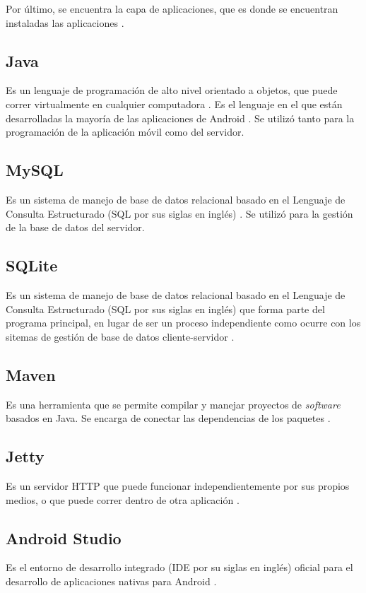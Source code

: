 Por último, se encuentra la capa de aplicaciones, que es donde se encuentran instaladas las aplicaciones \cite{AND3}.

\subsection{Java}
Es un lenguaje de programación de alto nivel orientado a objetos, que puede correr virtualmente en cualquier computadora \cite{JAV1}. Es el lenguaje en el que están desarrolladas la mayoría de las aplicaciones de Android \cite{AND2}. Se utilizó tanto para la programación de la aplicación móvil como del servidor.

\subsection{MySQL} 
Es un sistema de manejo de base de datos relacional basado en el Lenguaje de Consulta Estructurado (SQL por sus siglas en inglés) \cite{SQL1}. Se utilizó para la gestión de la base de datos del servidor.

\subsection{SQLite}
Es un sistema de manejo de base de datos relacional basado en el Lenguaje de Consulta Estructurado (SQL por sus siglas en inglés) que forma parte del programa principal, en lugar de ser un proceso independiente como ocurre con los sitemas de gestión de base de datos cliente-servidor \cite{SQL2}.

\subsection{Maven}
Es una herramienta que se permite compilar y  manejar proyectos de \textit{software} basados en Java. Se encarga de conectar las dependencias de los paquetes \cite{MVN1}.

\subsection{Jetty}
Es un servidor HTTP que puede funcionar independientemente por sus propios medios, o que puede correr dentro de otra aplicación \cite{JTY1}.

\subsection{Android Studio}
Es el entorno de desarrollo integrado (IDE por su siglas en inglés) oficial para el desarrollo de aplicaciones nativas para Android \cite{ASD1}.

